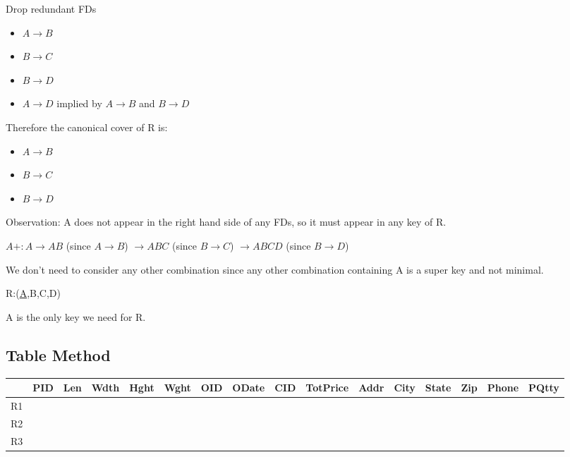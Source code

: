 \documentclass[a4paper]{article}
\begin{document}
Drop redundant FDs
\begin{itemize}
    \item $A \rightarrow B$
    \item $B \rightarrow C$
    \item $B \rightarrow D$
    \item \sout{$A \rightarrow D$} implied by $A \rightarrow B$ and $B \rightarrow D$
\end{itemize}

Therefore the canonical cover of R is:

\begin{itemize}
    \item $A \rightarrow B$
    \item $B \rightarrow C$
    \item $B \rightarrow D$
\end{itemize}

Observation: A does not appear in the right hand side of any FDs, so it must appear in any key of R.

$A+: A \rightarrow AB$ (since $A \rightarrow B$) $\rightarrow ABC$ (since $B \rightarrow C$) $\rightarrow ABCD$ (since $B \rightarrow D$)

We don't need to consider any other combination since any other combination containing A is a super key and not minimal.

R:(\underline{A},B,C,D)

A is the only key we need for R.

\subsection{Table Method}
\begin{table}[htb]
\begin{tabular}{|l|l|l|l|l|l|l|l|l|l|l|l|l|l|l|l|}
\hline
   & PID & Len & Wdth & Hght & Wght & OID & ODate & CID & TotPrice & Addr & City & State & Zip & Phone & PQtty \\ \hline
R1 &     &     &      &      &      &     &       &     &          &      &      &       &     &       &       \\ \hline
R2 &     &     &      &      &      &     &       &     &          &      &      &       &     &       &       \\ \hline
R3 &     &     &      &      &      &     &       &     &          &      &      &       &     &       &       \\ \hline
\end{tabular}
\end{table}
\end{document}

